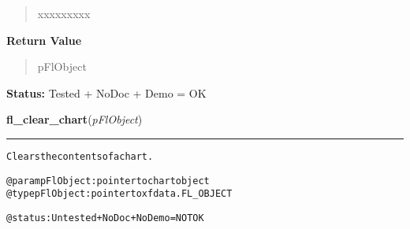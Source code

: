 \begin{boxedminipage}{\funcwidth}
\begin{quote}
\begin{Ventry}{xxxxxxxxx}
        \end{Ventry}

      \end{quote}

      \textbf{Return Value}
    \vspace{-1ex}

      \begin{quote}
      pFlObject

      \end{quote}

\textbf{Status:} Tested + NoDoc + Demo = OK



    \end{boxedminipage}

    \label{xformslib:flchart:fl_clear_chart}

    \vspace{0.5ex}

\hspace{.8\funcindent}\begin{boxedminipage}{\funcwidth}

    \raggedright \textbf{fl\_clear\_chart}(\textit{pFlObject})

    \vspace{-1.5ex}

    \rule{\textwidth}{0.5\fboxrule}
\setlength{\parskip}{2ex}
\begin{alltt}
        Clears the contents of a chart.

        @param pFlObject: pointer to chart object
@type pFlObject: pointer to xfdata.FL\_OBJECT

        @status: Untested + NoDoc + NoDemo = NOT OK
    
\end{alltt}

\setlength{\parskip}{1ex}
    \end{boxedminipage}

    \label{xformslib:flchart:fl_add_chart_value}

    \vspace{0.5ex}

